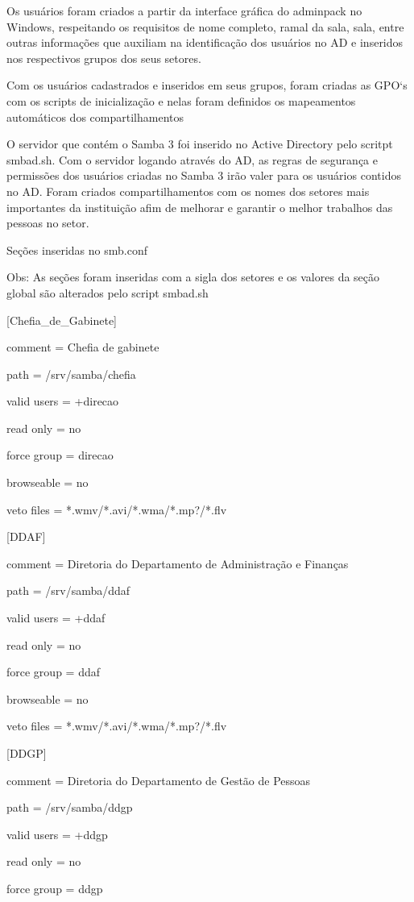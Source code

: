 Os usuários foram criados a partir da interface gráfica do adminpack no Windows, respeitando os requisitos de nome completo, ramal da sala, sala, entre outras informações que auxiliam na identificação dos usuários no AD e inseridos nos respectivos grupos dos seus setores.

Com os usuários cadastrados e inseridos em seus grupos, foram criadas as GPO`s com os scripts de inicialização e nelas foram definidos os mapeamentos automáticos dos compartilhamentos

O servidor que contém o Samba 3 foi inserido no Active Directory pelo scritpt smbad.sh. Com o servidor logando através do AD, as regras de segurança e permissões dos usuários criadas no Samba 3 irão valer para os usuários contidos no AD. Foram criados compartilhamentos com os nomes dos setores mais importantes da instituição afim de melhorar e garantir o melhor trabalhos das pessoas no setor.

Seções inseridas no smb.conf

Obs:  As seções foram inseridas com a sigla dos setores e os valores da seção global são alterados pelo script smbad.sh

[Chefia\_de\_Gabinete]

comment = Chefia de gabinete

path = /srv/samba/chefia

valid users = +direcao

read only = no

force group = direcao

browseable = no

veto files = *.wmv/*.avi/*.wma/*.mp?/*.flv

[DDAF] 

comment = Diretoria do Departamento de Administração e Finanças

path = /srv/samba/ddaf

valid users = +ddaf

read only = no

force group = ddaf

browseable = no

veto files = *.wmv/*.avi/*.wma/*.mp?/*.flv

[DDGP] 

comment = Diretoria do Departamento de Gestão de Pessoas

path = /srv/samba/ddgp

valid users = +ddgp

read only = no

force group = ddgp

